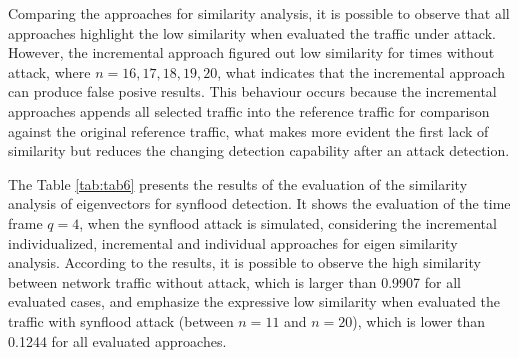 \documentclass{bmcart}
\begin{document}
Comparing the approaches for similarity analysis, it is possible to observe that all approaches highlight the low similarity when evaluated the traffic under attack. However, the incremental approach figured out low similarity for times without attack, where $n=16, 17, 18, 19, 20$, what indicates that the incremental approach can produce false posive results. This behaviour occurs because the incremental approaches appends all selected traffic into the reference traffic for comparison against the original reference traffic, what makes more evident the first lack of similarity but reduces the changing detection capability after an attack detection.

The Table \ref{tab:tab6} presents the results of the evaluation of the similarity analysis of eigenvectors for synflood detection. It shows the evaluation of the time frame $q=4$, when the synflood attack is simulated, considering the incremental individualized, incremental and individual approaches for eigen similarity analysis. According to the  results, it is possible to observe the high similarity between network traffic without attack, which is larger than 0.9907 for all evaluated cases, and emphasize the expressive low similarity when evaluated the traffic with synflood attack (between $n=11$ and $n=20$), which is lower than 0.1244 for all evaluated approaches.
\end{document}
